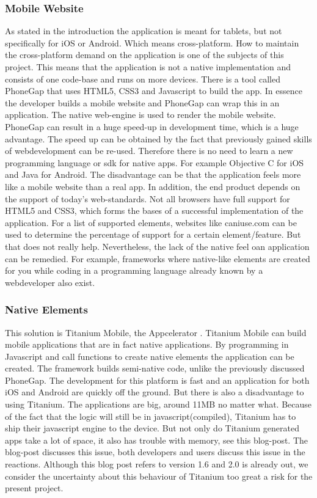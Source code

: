 \subsubsection{Mobile Website}
As stated in the introduction the application is meant for tablets, but not specifically for iOS or Android. Which means cross-platform. How to maintain the cross-platform demand on the application is one of the subjects of this project. This means that the application is not a native implementation and consists of one code-base and runs on more devices. There is a tool called PhoneGap \cite{PhoneGap} that uses HTML5\cite{HTML5}, CSS3\cite{C3} and Javascript to build the app. In essence the developer builds a mobile website and PhoneGap can wrap this in an application. The native web-engine is used to render the mobile website. PhoneGap can result in a huge speed-up in development time, which is a huge advantage. The speed up can be obtained by the fact that previously gained skills of webdevelopment can be re-used. Therefore there is no need to learn a new programming language or sdk\cite{SDK} for native apps. For example Objective C for iOS and Java for Android. The disadvantage can be that the application feels more like a mobile website than a real app. In addition, the end product depends on the support of today's web-standards. Not all browsers have full support for HTML5 and CSS3, which forms the bases of a successful implementation of the application. For a list of supported elements, websites like caniuse.com \cite{CSS3} can be used to determine the percentage of support for a certain element/feature. But that does not really help. Nevertheless, the lack of the native feel oan application can be remedied. For example, frameworks where native-like elements are created for you while coding in a programming language already known by a webdeveloper also exist.

\subsubsection*{Native Elements}
This solution is Titanium Mobile, the Appcelerator \cite{Titanium-Appcelerator}. Titanium Mobile can build mobile applications that are in fact native applications. By programming in Javascript and call functions to create native elements the application can be created. The framework builds semi-native code, unlike the previously discussed PhoneGap. The development for this platform is fast and an application for both iOS and Android are quickly off the ground. But there is also a disadvantage to using Titanium. The applications are big, around 11MB no matter what. Because of the fact that the logic will still be in javascript(compiled), Titanium has to ship their javascript engine to the device. But not only do Titanium generated apps take a lot of space, it also has trouble with memory, see this blog-post\cite{memoryleak}. The blog-post discusses this issue, both developers and users discuss this issue in the reactions. Although this blog post refers to version 1.6 and 2.0 is already out, we consider the uncertainty about this behaviour of Titanium too great a risk for the present project.

